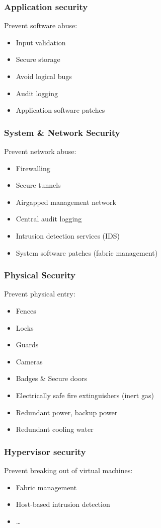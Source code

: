 \documentclass{beamer}
\begin{document}
\begin{frame}
    \frametitle{Application security}
    Prevent software abuse:
    \begin{itemize}
      \item Input validation
      \item Secure storage
      \item Avoid logical bugs
      \item Audit logging
      \item Application software patches
    \end{itemize}
\end{frame}

\begin{frame}
    \frametitle{System \& Network Security}
    Prevent network abuse:
    \begin{itemize}
      \item Firewalling
      \item Secure tunnels %
      \item Airgapped management network
      \item Central audit logging
      \item Intrusion detection services (IDS)
      \item System software patches (fabric management)
    \end{itemize}
\end{frame}

\begin{frame}
    \frametitle{Physical Security}
    Prevent physical entry:
    \begin{itemize}
      \item Fences
      \item Locks
      \item Guards
      \item Cameras
      \item Badges \& Secure doors
      \item Electrically safe fire extinguishers (inert gas)
      \item Redundant power, backup power
      \item Redundant cooling water
    \end{itemize}
\end{frame}

\begin{frame}
    \frametitle{Hypervisor security}
    Prevent breaking out of virtual machines:
    \begin{itemize}
      \item Fabric management
      \item Host-based intrusion detection
      \item \dots
    \end{itemize}
\end{frame}
\end{document}
